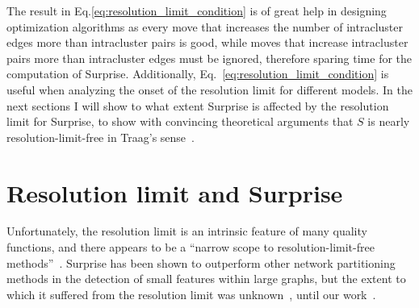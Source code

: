 
The result in Eq.\ref{eq:resolution_limit_condition} is of great help in designing optimization algorithms as every move that increases the number of intracluster edges more than intracluster pairs is good, while moves that increase intracluster pairs more than intracluster edges must be ignored, therefore sparing time for the computation of Surprise.
Additionally, Eq.~\ref{eq:resolution_limit_condition} is useful when analyzing the onset of the resolution limit for different models.
In the next sections I will show to what extent Surprise is affected by the resolution limit for Surprise, to show with convincing theoretical arguments that $S$ is nearly resolution-limit-free in Traag's sense~\cite{traag2015}.

\section{Resolution limit and Surprise}
Unfortunately, the resolution limit is an intrinsic feature of many quality functions, and there appears to be a ``narrow scope to resolution-limit-free methods''~\cite{traag2015}.
Surprise has been shown to outperform other network partitioning methods in the detection of small features within large graphs, but the extent to which it suffered from the resolution limit was unknown~\cite{aldecoa2011,aldecoa2013}, until our work~\cite{nicolini2016}.

